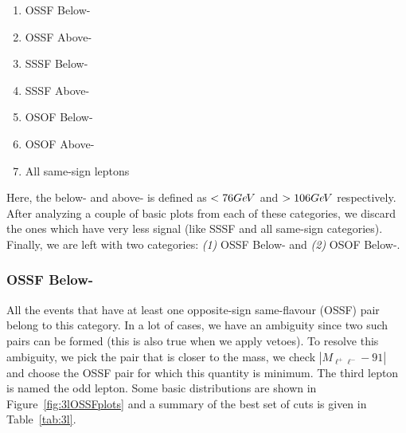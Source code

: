 \documentclass[letterpaper,12pt]{article}
\newcommand{\GeV}{{Ge\kern -0.1em V}}
\begin{document}
\begin{enumerate}
\item OSSF Below-\Zboson
\item OSSF Above-\Zboson
\item SSSF Below-\Zboson
\item SSSF Above-\Zboson
\item OSOF Below-\Zboson
\item OSOF Above-\Zboson
\item All same-sign leptons
\end{enumerate}

Here, the below-\Zboson{} and above-\Zboson{} is defined as $<76\GeV$ and $>106\GeV$ respectively. After analyzing a couple of basic plots from each of these categories, we discard the ones which have very less signal (like SSSF and all same-sign categories). Finally, we are left with two categories: \emph{(1)} OSSF Below-\Zboson{} and \emph{(2)} OSOF Below-\Zboson.

\subsubsection{OSSF Below-{\boldmath \Zboson}}
\label{sec:ossf}

All the events that have at least one opposite-sign same-flavour (OSSF) pair belong to this category. In a lot of cases, we have an ambiguity since two such pairs can be formed (this is also true when we apply vetoes). To resolve this ambiguity, we pick the pair that is closer to the \Zboson{} mass, \ie{} we check $|M_{\ell^{+}\ell^{-}} - 91|$ and choose the OSSF pair for which this quantity is minimum. The third lepton is named the odd lepton. Some basic distributions are shown in Figure~\ref{fig:3lOSSFplots} and a summary of the best set of cuts is given in Table~\ref{tab:3l}.
\end{document}
